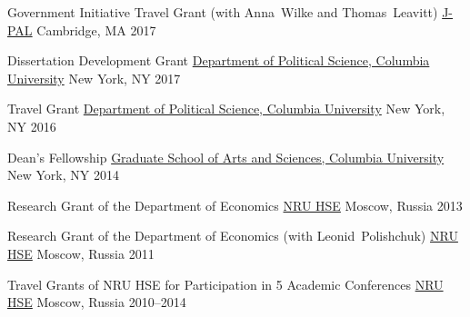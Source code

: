



\begin{cvhonors}

  \cvhonor
    {Government Initiative Travel Grant (with Anna~Wilke and Thomas~Leavitt)} %
    {\href{http://polisci.columbia.edu/}{J-PAL}} %
    {Cambridge, MA} %
    {2017} %

  \cvhonor
    {Dissertation Development Grant} %
    {\href{http://polisci.columbia.edu/}{Department of Political Science, Columbia University}} %
    {New York, NY} %
    {2017} %

  \cvhonor
    {Travel Grant} %
    {\href{http://polisci.columbia.edu/}{Department of Political Science, Columbia University}} %
    {New York, NY} %
    {2016} %

  \cvhonor
    {Dean's Fellowship} %
    {\href{http://gsas.columbia.edu/content/fellowship-categories}{Graduate School of Arts and Sciences, Columbia University}} %
    {New York, NY} %
    {2014} %

  \cvhonor
    {Research Grant of the Department of Economics} %
    {\href{http://www.hse.ru/en/}{NRU HSE}} %
    {Moscow, Russia} %
    {2013} %

  \cvhonor
    {Research Grant of the Department of Economics (with Leonid~Polishchuk)} %
    {\href{http://www.hse.ru/en/}{NRU HSE}} %
    {Moscow, Russia} %
    {2011} %

  \cvhonor
    {Travel Grants of NRU HSE for Participation in 5 Academic Conferences} %
    {\href{http://www.hse.ru/en/}{NRU HSE}} %
    {Moscow, Russia} %
    {2010--2014} %

\end{cvhonors}


